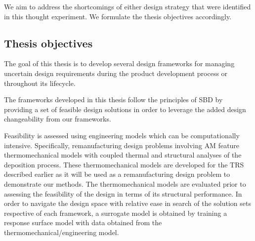 We aim to address the shortcomings of either design strategy that were identified in this thought experiment. We formulate the thesis objectives accordingly.

\subsection{Thesis objectives} \label{subsec:objectives}




The goal of this thesis is to develop several design frameworks for managing uncertain design requirements during the product development process or throughout its lifecycle. 

The frameworks developed in this thesis follow the principles of \acf{SBD} by providing a set of feasible design solutions in order to leverage the added design changeability from our frameworks. 

Feasibility is assessed using engineering models which can be computationally intensive. Specifically, remanufacturing design problems involving \ac{AM} feature thermomechanical models with coupled thermal and structural analyses of the deposition process. These thermomechanical models are developed for the \ac{TRS} described earlier as it will be used as a remanufacturing design problem to demonstrate our methods. The thermomechanical models are evaluated prior to assessing the feasibility of the design in terms of its structural performance. In order to navigate the design space with relative ease in search of the solution sets respective of each framework, a surrogate model is obtained by training a response surface model with data obtained from the thermomechanical/engineering model.

